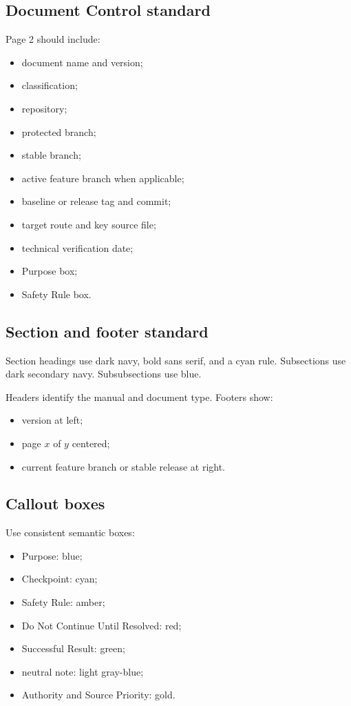 \documentclass[11pt,letterpaper]{article}
\begin{document}
\subsection{Document Control standard}

Page 2 should include:

\begin{itemize}
    \item document name and version;
    \item classification;
    \item repository;
    \item protected branch;
    \item stable branch;
    \item active feature branch when applicable;
    \item baseline or release tag and commit;
    \item target route and key source file;
    \item technical verification date;
    \item Purpose box;
    \item Safety Rule box.
\end{itemize}

\subsection{Section and footer standard}

Section headings use dark navy, bold sans serif, and a cyan rule. Subsections
use dark secondary navy. Subsubsections use blue.

Headers identify the manual and document type. Footers show:

\begin{itemize}
    \item version at left;
    \item page \(x\) of \(y\) centered;
    \item current feature branch or stable release at right.
\end{itemize}

\subsection{Callout boxes}

Use consistent semantic boxes:

\begin{itemize}
    \item Purpose: blue;
    \item Checkpoint: cyan;
    \item Safety Rule: amber;
    \item Do Not Continue Until Resolved: red;
    \item Successful Result: green;
    \item neutral note: light gray-blue;
    \item Authority and Source Priority: gold.
\end{itemize}
\end{document}
